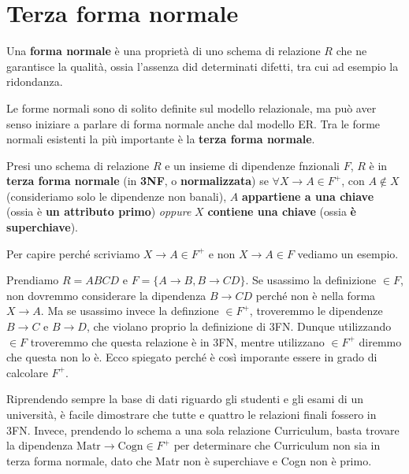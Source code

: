 \documentclass[11pt, a4paper, titlepage, oneside]{scrbook}
\begin{document}
\section{Terza forma normale}

\begin{Definizione}
\label{def-forma normale}
Una \textbf{forma normale} è una proprietà di uno schema di relazione $R$ che ne garantisce la qualità, ossia l'assenza did determinati difetti, tra cui ad esempio la ridondanza.
\end{Definizione}

Le forme normali sono di solito definite sul modello relazionale, ma può aver senso iniziare a parlare di forma normale anche dal modello ER. Tra le forme normali esistenti la più importante è la \textbf{terza forma normale}.

\begin{Definizione}
\label{def-3NF}
Presi uno schema di relazione $R$ e un insieme di dipendenze fnzionali $F$, $R$ è in \textbf{terza forma normale} (in \textbf{3NF}, o \textbf{normalizzata}) se $\forall X \longrightarrow A \in F^+$, con $A \notin X$ (consideriamo solo le dipendenze non banali), $A$ \textbf{appartiene a una chiave} (ossia è \textbf{un attributo primo}) \textit{oppure} $X$ \textbf{contiene una chiave} (ossia \textbf{è superchiave}). 
\end{Definizione}

Per capire perché scriviamo $X \longrightarrow A \in F^+$ e non $X \longrightarrow A \in F$ vediamo un esempio. 

Prendiamo $R = ABCD$ e $F = \{A \longrightarrow B, B \longrightarrow CD\}$. Se usassimo la definizione $\in F$, non dovremmo considerare la dipendenza $B \longrightarrow CD$ perché non è nella forma $X \longrightarrow A$. Ma se usassimo invece la definzione $\in F^+$, troveremmo le dipendenze $B \longrightarrow C$ e $B \longrightarrow D$, che violano proprio la definizione di 3FN. Dunque utilizzando $\in F$ troveremmo che questa relazione è in 3FN, mentre utilizzano $\in F^+$ diremmo che questa non lo è. Ecco spiegato perché è così imporante essere in grado di calcolare $F^+$.

Riprendendo sempre la base di dati riguardo gli studenti e gli esami di un università, è facile dimostrare che tutte e quattro le relazioni finali fossero in 3FN. Invece, prendendo lo schema a una sola relazione Curriculum, basta trovare la dipendenza $\text{Matr} \longrightarrow \text{Cogn} \in F^+$ per determinare che Curriculum non sia in terza forma normale, dato che Matr non è superchiave e Cogn non è primo.
\end{document}
